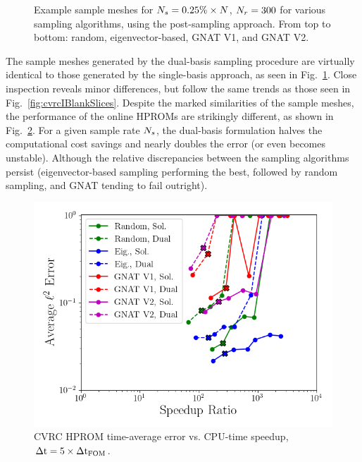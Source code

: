 \begin{figure}
\begin{minipage}{0.99\linewidth}
	\end{minipage}
	\caption{\label{fig:cvrcIBlankSlicesDual}Example sample meshes for $N_s = 0.25\% \times N$, $N_r = 300$ for various sampling algorithms, using the post-sampling approach. From top to bottom: random, eigenvector-based, GNAT V1, and GNAT V2.}
\end{figure}

The sample meshes generated by the dual-basis sampling procedure are virtually identical to those generated by the single-basis approach, as seen in Fig.~\ref{fig:cvrcIBlankSlicesDual}. Close inspection reveals minor differences, but follow the same trends as those seen in Fig.~\ref{fig:cvrcIBlankSlices}. Despite the marked similarities of the sample meshes, the performance of the online HPROMs are strikingly different, as shown in Fig.~\ref{fig:cvrcSampledROMErrVsTimeDual}. For a given sample rate $N_s$, the dual-basis formulation halves the computational cost savings and nearly doubles the error (or even becomes unstable). Although the relative discrepancies between the sampling algorithms persist (eigenvector-based sampling performing the best, followed by random sampling, and GNAT tending to fail outright).

\begin{figure}
	\centering
	\includegraphics[width=0.6\linewidth]{Chapters/HPROMResults/Images/cvrc/dualModes/sampled_dt5e-7_Average_errorRaw_pareto.png}
	\caption{\label{fig:cvrcSampledROMErrVsTimeDual}CVRC HPROM time-average error vs. CPU-time speedup, $\Delta \text{t} = 5 \times \Delta \text{t}_{\text{FOM}}$.}
\end{figure}

